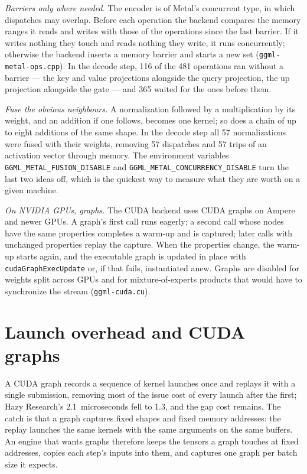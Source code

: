 \emph{Barriers only where needed.} The encoder is of Metal's concurrent type,
in which dispatches may overlap. Before each operation the backend compares the
memory ranges it reads and writes with those of the operations since the last
barrier. If it writes nothing they touch and reads nothing they write, it runs
concurrently; otherwise the backend inserts a memory barrier and starts a new
set (\texttt{ggml-metal-ops.cpp}). In the decode step, 116 of the 481
operations ran without a barrier --- the key and value projections alongside
the query projection, the up projection alongside the gate --- and 365 waited
for the ones before them.

\emph{Fuse the obvious neighbours.} A normalization followed by a
multiplication by its weight, and an addition if one follows, becomes one
kernel; so does a chain of up to eight additions of the same shape. In the
decode step all 57 normalizations were fused with their weights, removing 57
dispatches and 57 trips of an activation vector through memory. The
environment variables \texttt{GGML\_METAL\_FUSION\_DISABLE} and
\texttt{GGML\_METAL\_CONCURRENCY\_DISABLE} turn the last two ideas off, which is
the quickest way to measure what they are worth on a given machine.

\emph{On NVIDIA GPUs, graphs.} The CUDA backend uses CUDA graphs on Ampere and
newer GPUs. A graph's first call runs eagerly; a second call whose nodes have
the same properties completes a warm-up and is captured; later calls with
unchanged properties replay the capture. When the properties change, the
warm-up starts again, and the executable graph is updated in place with
\texttt{cudaGraphExecUpdate} or, if that fails, instantiated anew. Graphs are
disabled for weights split across GPUs and for mixture-of-experts products
that would have to synchronize the stream (\texttt{ggml-cuda.cu}).

\section{Launch overhead and CUDA graphs}

A CUDA graph records a sequence of kernel launches once and replays it with a
single submission, removing most of the issue cost of every launch after the
first; Hazy Research's 2.1~microseconds fell to 1.3, and the gap cost remains.
The catch is that a graph captures fixed shapes and fixed memory addresses:
the replay launches the same kernels with the same arguments on the same
buffers. An engine that wants graphs therefore keeps the tensors a graph
touches at fixed addresses, copies each step's inputs into them, and captures
one graph per batch size it expects.

